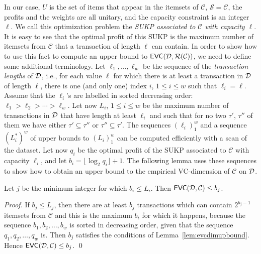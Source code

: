 In our case, $U$ is the set of items that appear in the itemsets of
$\mathcal{C}$, $\mathcal{S}=\mathcal{C}$, the profits and the weights are all
unitary, and the capacity constraint is an integer $\ell$. We call this
optimization problem the \emph{SUKP associated to $\mathcal{C}$ with capacity
$\ell$}.
It is easy to see %
that the optimal profit of this SUKP is the maximum number
of itemsets from $\mathcal{C}$ that a transaction of length $\ell$ can contain.  %
In order to show how to use this fact to compute an upper bound to
$\mathsf{EVC}({\cal D},\mathcal{R}(\mathcal{C}))$, we need to define some additional terminology. Let
$\ell_1,\dotsc,\ell_w$ be the sequence of the
\emph{transaction lengths} of ${\cal D}$, i.e., for each value $\ell$
for which there is at least a transaction in ${\cal D}$ of length $\ell$, there is
one (and only one) index $i$, $1\le i\le w$ such that $\ell_i=\ell$. Assume that
the $\ell_i$'s are labelled in sorted decreasing order:
$\ell_1>\ell_2>\dotsb>\ell_w$. Let now $L_i$, $1\le i\le w$ be the maximum number of
transactions in ${\cal D}$ that have length at least $\ell_i$ and such that
for no two $\tau'$, $\tau''$ of them we have either $\tau'\subseteq\tau''$ or
$\tau''\subseteq\tau'$. The sequences $(\ell_i)_1^w$ and a sequence $(L_i^*)^w$
of upper bounds to $(L_i)_1^w$ can be computed efficiently with a scan of the
dataset. Let now $q_i$ be the optimal profit of the SUKP associated to
$\mathcal{C}$ with capacity $\ell_i$, and let $b_i=\lfloor \log_2q_i\rfloor +1$.
The following lemma uses these sequences to show how to obtain an upper bound to
the empirical VC-dimension of $\mathcal{C}$ on ${\cal D}$.

\begin{lemma}\label{lem:sukpevc}
  Let $j$ be the minimum integer for which $b_i\le L_i$. Then
  $\mathsf{EVC}({\cal D},\mathcal{C})\le b_j$. %
\end{lemma}
\ifarxiv
\begin{proof}
  If $b_j\le L_j$, then there are at least $b_j$ transactions which can contain
  $2^{b_j-1}$ itemsets from $\mathcal{C}$ and this is the maximum $b_i$ for
  which it happens, because the sequence $b_1,b_2,\dotsc,b_w$ is sorted in
  decreasing order, given that the sequence $q_1,q_2,\dotsc,q_w$ is. Then $b_j$
  satisfies the conditions of Lemma~\ref{lem:evcdimupbound}. Hence
  $\mathsf{EVC}({\cal D},\mathcal{C})\le b_j$.
  \qed
\end{proof}
\fi

